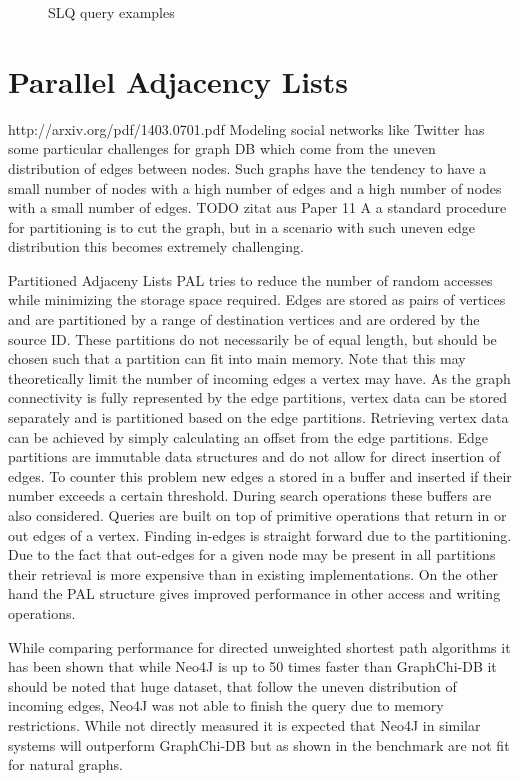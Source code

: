 \documentclass{sig-alternate}
\begin{document}
\begin{figure}
\centering
{}
\caption{SLQ query examples}
\label{fig:slqexample}
\end{figure}

\section{Parallel Adjacency Lists}
http://arxiv.org/pdf/1403.0701.pdf
Modeling social networks like Twitter has some particular challenges
for graph DB which come from the uneven distribution of edges between nodes.
Such graphs have the tendency to have a small number of nodes with a high number of edges
and a high number of nodes with a small number of edges. TODO zitat aus Paper 11
A a standard procedure for partitioning is to cut the graph, but in 
a scenario with such uneven edge distribution this becomes extremely challenging.

Partitioned Adjaceny Lists PAL tries to reduce the number of random accesses while minimizing the storage
space required. Edges are stored as pairs of vertices and are partitioned by a range of destination
vertices and are ordered by the source ID. These partitions do not necessarily be of equal length, but should 
be chosen such that a partition can fit into main memory. Note that this may theoretically limit the number of
incoming edges a vertex may have.
As the graph connectivity is fully represented 
by the edge partitions, vertex data can be stored separately and is partitioned 
based on the edge partitions. Retrieving vertex data can be achieved by simply calculating an offset from
the edge partitions.
Edge partitions are immutable data structures and do not allow for direct insertion of edges. 
To counter this problem new edges a stored in a buffer and inserted if their number exceeds a certain threshold.
During search operations these buffers are also considered.
Queries are built on top of primitive operations that return in or out edges of a vertex.
Finding in-edges is straight forward due to the partitioning. Due to the fact that out-edges
for a given node may be present in all partitions their retrieval is more expensive than
in existing implementations. On the other hand the PAL structure gives improved performance in other access and writing operations.

While comparing performance for directed unweighted shortest path algorithms it has been shown that while Neo4J
is up to 50 times faster than GraphChi-DB it should be noted that huge dataset, that follow the uneven distribution 
of incoming edges, Neo4J was not able to finish the query due to memory restrictions.
While not directly measured it is expected that Neo4J in similar systems will outperform 
GraphChi-DB but as shown in the benchmark are not fit for natural graphs.
\end{document}
